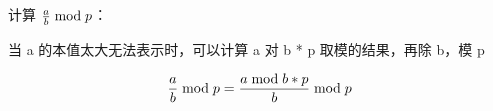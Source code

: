 计算 ${a \over b} \bmod p$：

当 a 的本值太大无法表示时，可以计算 a 对 b * p 取模的结果，再除 b，模 p

$$ {a \over b} \bmod p = {{ a \bmod {b * p} } \over b } \bmod p $$
